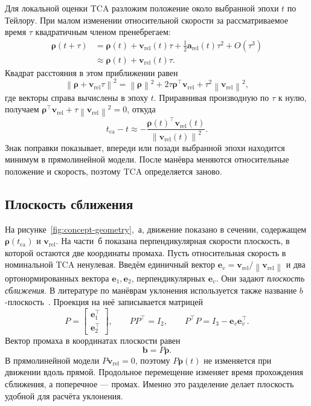 \documentclass[a4paper,11pt]{article}
\newcommand{\vect}[1]{\boldsymbol{#1}}
\newcommand{\norm}[1]{\left\lVert#1\right\rVert}
\numberwithin{equation}{section}
\begin{document}
Для локальной оценки TCA разложим положение около выбранной эпохи
$t$ по Тейлору. При малом изменении относительной скорости
за рассматриваемое время $\tau$ квадратичным членом пренебрегаем:
\begin{equation}
\begin{aligned}
\vect\rho(t+\tau)
&=\vect\rho(t)+\vect v_{\mathrm{rel}}(t)\tau
 +\tfrac12\vect a_{\mathrm{rel}}(t)\tau^2+O(\tau^3)\\
&\approx\vect\rho(t)+\vect v_{\mathrm{rel}}(t)\tau.
\end{aligned}
\label{eq:straight-line}
\end{equation}
Квадрат расстояния в этом приближении равен
\[
\norm{\vect\rho+\vect v_{\mathrm{rel}}\tau}^2
=\norm{\vect\rho}^2+
2\tau\vect\rho^\top\vect v_{\mathrm{rel}}
+\tau^2\norm{\vect v_{\mathrm{rel}}}^2,
\]
где векторы справа вычислены в эпоху $t$. Приравнивая производную
по $\tau$ к нулю, получаем
$\vect\rho^\top\vect v_{\mathrm{rel}}
+\tau\norm{\vect v_{\mathrm{rel}}}^2=0$, откуда
\begin{equation}
t_{\mathrm{ca}}-t\approx
-\frac{\vect\rho(t)^\top\vect v_{\mathrm{rel}}(t)}
       {\norm{\vect v_{\mathrm{rel}}(t)}^2}.
\label{eq:linear-tca}
\end{equation}
Знак поправки показывает, впереди или позади выбранной эпохи
находится минимум в прямолинейной модели. После манёвра меняются
относительные положение и скорость, поэтому TCA определяется заново.

\subsection{Плоскость сближения}

На рисунке~\ref{fig:concept-geometry},~а, движение показано в сечении,
содержащем $\vect\rho(t_{\mathrm{ca}})$ и $\vect v_{\mathrm{rel}}$.
На части~б показана перпендикулярная скорости плоскость,
в которой остаются две координаты промаха.
Пусть относительная скорость в номинальной TCA ненулевая.
Введём единичный вектор
$\vect e_v=\vect v_{\mathrm{rel}}/\norm{\vect v_{\mathrm{rel}}}$
и два ортонормированных вектора $\vect e_1,\vect e_2$,
перпендикулярных $\vect e_v$. Они задают \emph{плоскость сближения}.
В литературе по манёврам уклонения используется также название
$b$-плоскость~\cite{gonzalo}.
Проекция на неё записывается матрицей
\begin{equation}
P=\begin{bmatrix}\vect e_1^\top\\\vect e_2^\top\end{bmatrix},
\qquad
PP^\top=I_2,\qquad
P^\top P=I_3-\vect e_v\vect e_v^\top.
\label{eq:encounter-projection}
\end{equation}
Вектор промаха в координатах плоскости равен
\begin{equation}
\vect b=P\vect\rho.
\label{eq:miss-plane}
\end{equation}
В прямолинейной модели $P\vect v_{\mathrm{rel}}=0$, поэтому
$P\vect\rho(t)$ не изменяется при движении вдоль прямой.
Продольное перемещение изменяет время прохождения сближения,
а поперечное --- промах. Именно это разделение делает плоскость
удобной для расчёта уклонения.
\end{document}
